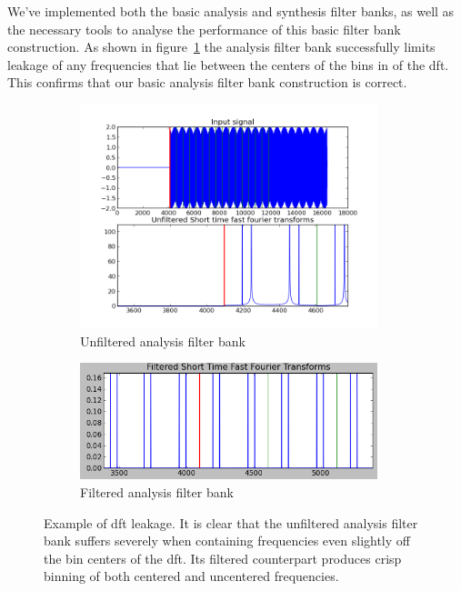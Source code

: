 \documentclass[a4paper,10pt]{article}
\begin{document}
We've implemented both the basic analysis and synthesis filter banks, as well as the necessary tools to analyse the performance of this basic filter bank construction. As shown in 
figure~\ref{filtered_and_unfiltered_analysis} the analysis filter bank successfully limits leakage of any frequencies that lie between the centers of the bins in of the \gls{dft}.
This confirms that our basic analysis filter bank construction is correct.
\begin{figure}[h]
 \begin{subfigure}{0.5\textwidth}
  \includegraphics[width=0.95\textwidth]{unfiltered.png}
  \caption{Unfiltered analysis filter bank}
 \end{subfigure}
 \begin{subfigure}{0.5\textwidth}
  \includegraphics[width=0.95\textwidth]{filtered.png}
  \caption{Filtered analysis filter bank}
 \end{subfigure}
\caption{Example of \gls{dft} leakage. It is clear that the unfiltered analysis filter bank suffers severely when containing frequencies even slightly off the bin centers
	 of the \gls{dft}. Its filtered counterpart produces crisp binning of both centered and uncentered frequencies.}
\label{filtered_and_unfiltered_analysis}
\end{figure}
\end{document}
